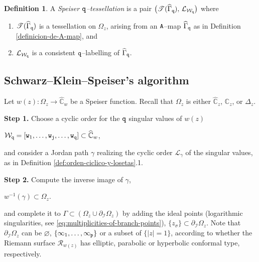 \documentclass[final,3p,times]{elsarticle}
\newcommand{\CC}{\ensuremath{{\mathbb C}}}
\newcommand{\CW}{\ensuremath{{\widehat{\mathbb C}}}}
\newcommand{\R}{\ensuremath{{\mathcal R}}}
\newcommand{\abs}[1]{\left\lvert#1\right\rvert}
\theoremstyle{definition}
\newtheorem{definition}[theorem]{Definition}
\begin{document}
\begin{definition}
\label{def:Speiser-tessellation}
A \emph{Speiser $\tt q$--tessellation}
is a pair $\big(\mathscr{T}(\widehat{\Gamma}_{\tt q}),\, \mathcal{L}_{\mathcal{W}_{\tt q}} \big)$
where
\begin{enumerate}[label=\roman*),leftmargin=*] 
\item
$\mathscr{T}(\widehat{\Gamma}_{\tt q})$ is a tessellation on 
$\Omega_z$, 
arising from an $\tt A$--map $\widehat{\Gamma}_{\tt q}$
as in Definition \ref{definicion-de-A-map}, 
and 

\item
$\mathcal{L}_{\mathcal{W}_{\tt q}}$ is a consistent $\tt q$--labelling of $\widehat{\Gamma}_{\tt q}$.
\end{enumerate}
\end{definition}


\subsection{Schwarz--Klein--Speiser's algorithm}
\label{sec:Schwarz-Klein-Speiser-algorithm}
 
\smallskip 

\noindent 
Let $w(z):\Omega_z \longrightarrow \CW_w$ be a 
Speiser function. 
Recall that $\Omega_z$ is either $\CW_z$, $\CC_z$, or 
$\Delta_z$.

\noindent 
{\bf Step 1.}
Choose a cyclic order for the $\tt q$ singular values of $w(z)$

\centerline{$
\mathcal{W}_{\tt q} =
[{\tt w}_1, \ldots, 
{\tt w}_{\tt j}, \ldots,
{\tt w}_{\tt q} ] \subset \CW_w$,
}


\noindent 
and
consider
a Jordan path $\gamma$ realizing the cyclic order $\mathcal{L}_\gamma$ of the
singular values, as in Definition \ref{def:orden-ciclico-y-losetas}.1.

\noindent 
{\bf Step 2.} 
Compute the inverse image of $\gamma$,

\centerline{
$w^{-1}(\gamma) \subset \Omega_z$.
}

\noindent
and complete it to $\Gamma\subset ( \Omega_z \cup \partial_{\mathcal{I}}\Omega_z )$ 
by adding the ideal points (logarithmic singularities, 
see \eqref{eq:multiplicities-of-branch-points}),
$\{ z_\sigma \} \subset \partial_{\mathcal{I}}\Omega_z$.
Note that $\partial_{\mathcal{I}}\Omega_z $ can be 
$\varnothing$, $\{ \infty_1,\ldots,\infty_{\tt p} \}$
or a subset of $\{ \abs{z}  = 1\}$, 
according to whether the Riemann surface $\R_{w(z)}$ has elliptic, parabolic or 
hyperbolic conformal type, respectively.
\end{document}
